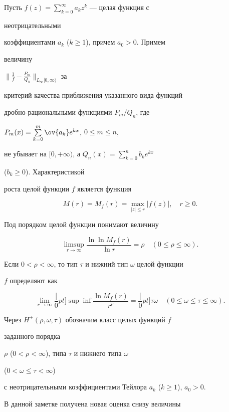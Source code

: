 Пусть $f(z)=\sum\limits^\infty_{k=0}a_k z^k$ --- целая функция с 


неотрицательными 


коэффициентами $a_k$ ($k\ge1$), причем $a_0>0$. Примем 


величину 


$\big\|\frac{1}{f}-\frac{P_m}{Q_n}\big\|_{L_\infty[0,\infty)}$ за 


критерий качества приближения указанного вида функций 


дробно-рациональными функциями $P_m/Q_n$, где 


$P_m(x)=\sum\limits^m_{k=0}\ov{a_k}e^{kx}$, $0\le m\le n$, 


не убывает на $[0,+\infty)$, а $Q_n(x)=\sum\limits^n_{k=0}b_k e^{kx}$ 


($b_k\ge 0$). Характеристикой 


роста целой функции $f$ является функция 


$$ 


M(r)=M_f(r)=\max_{|z|\le r}|f(z)|,\quad r\ge 0. 


$$ 


Под порядком целой функции понимают величину 


$$


\limsup_{r\to\infty}\frac{\ln\ln M_f(r)}{\ln r} 


=\rho\quad (0\le\rho\le\infty). 


$$


Если $0<\rho<\infty$, то тип $\tau$ и нижний тип $\omega$ целой функции 


$f$ определяют как 


$$ 


\lim_{r\to\infty}\frac[0pt]{\sup}{\inf} 


\frac{\ln M_f(r)}{r^\rho}=\frac[0pt]{\tau}{\omega} 


\quad (0\le\omega\le\tau\le\infty). 


$$ 


 


Через $H^+(\rho,\omega,\tau)$ обозначим класс целых функций $f$ 


заданного порядка 


$\rho$ ($0<\rho<\infty$), типа $\tau$ и нижнего типа $\omega$ 


($0<\omega\le\tau<\infty$)  


с неотрицательными коэффициентами Тейлора $a_k$ ($k\ge 1$), $a_0>0$. 


В данной заметке получена новая оценка снизу величины  


